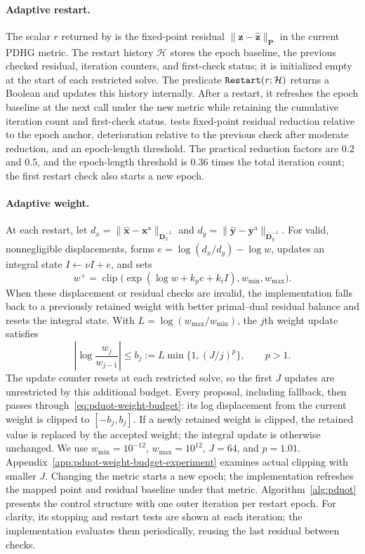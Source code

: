 \paragraph{Adaptive restart.}
The scalar $r$ returned by \pdhg is the fixed-point residual $\|\mathbf z-\widehat{\mathbf z}\|_{\mathbf P}$ in the current PDHG metric.
The restart history $\mathcal H$ stores the epoch baseline, the previous checked residual, iteration counters, and first-check status; it is initialized empty at the start of each restricted solve.
The predicate $\texttt{Restart}(r;\mathcal H)$ returns a Boolean and updates this history internally.
After a restart, it refreshes the epoch baseline at the next call under the new metric while retaining the cumulative iteration count and first-check status.
\checkrestart tests fixed-point residual reduction relative to the epoch anchor, deterioration relative to the previous check after moderate reduction, and an epoch-length threshold.
The practical reduction factors are $0.2$ and $0.5$, and the epoch-length threshold is $0.36$ times the total iteration count; the first restart check also starts a new epoch.

\paragraph{Adaptive weight.}
At each restart, let $d_x=\|\widehat{\mathbf{x}}-\mathbf{x}^{\mathrm a}\|_{\overline{\mathbf{D}}_x^{-1}}$ and $d_y=\|\widehat{\mathbf{y}}-\mathbf{y}^{\mathrm a}\|_{\overline{\mathbf{D}}_y^{-1}}$.
For valid, nonnegligible displacements, \updateweight forms $e=\log(d_x/d_y)-\log w$, updates an integral state $I\leftarrow\nu I+e$, and sets
\begin{equation*}
w^+ = \operatorname{clip}\bigl(\exp(\log w+k_pe+k_iI),w_{\min},w_{\max}\bigr).
\end{equation*}
When these displacement or residual checks are invalid, the implementation falls back to a previously retained weight with better primal--dual residual balance and resets the integral state.
With $L=\log(w_{\max}/w_{\min})$, the $j$th weight update satisfies
\begin{equation}
\label{eq:pduot-weight-budget}
\left|\log\frac{w_j}{w_{j-1}}\right|\leq b_j:=L\min\{1,(J/j)^p\},\qquad p>1.
\end{equation}
The update counter resets at each restricted solve, so the first $J$ updates are unrestricted by this additional budget.
Every proposal, including fallback, then passes through~\eqref{eq:pduot-weight-budget}: its log displacement from the current weight is clipped to $[-b_j,b_j]$.
If a newly retained weight is clipped, the retained value is replaced by the accepted weight; the integral update is otherwise unchanged.
We use $w_{\min}=10^{-12}$, $w_{\max}=10^{12}$, $J=64$, and $p=1.01$.
Appendix~\ref{app:pduot-weight-budget-experiment} examines actual clipping with smaller $J$.
Changing the metric starts a new epoch; the implementation refreshes the mapped point and residual baseline under that metric.
Algorithm~\ref{alg:pduot} presents the control structure with one outer iteration per restart epoch.
For clarity, its stopping and restart tests are shown at each iteration; the implementation evaluates them periodically, reusing the last residual between checks.

